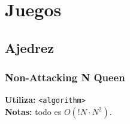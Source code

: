 \section{Juegos}
\subsection{Ajedrez}
\subsubsection{Non-Attacking N Queen}
\begin{footnotesize}
	\textbf{Utiliza:} \texttt{<algorithm>}\\
	\textbf{Notas:} todo es $ O(!N \cdot N^{2})$.
\end{footnotesize}

